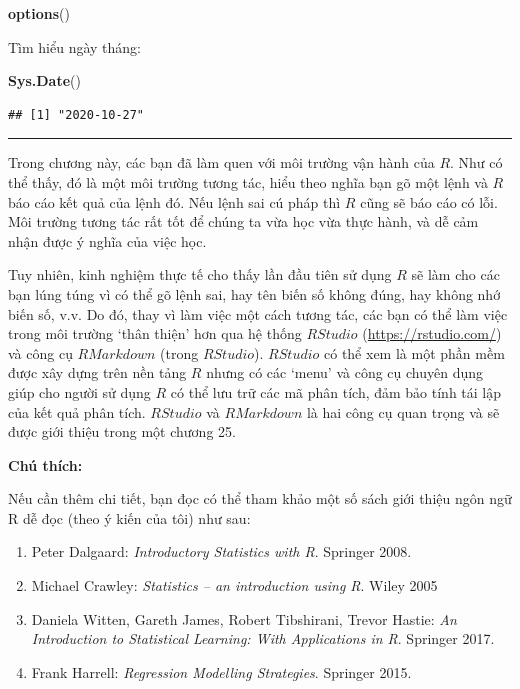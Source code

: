 \documentclass[
]{book}
\newenvironment{Shaded}{\begin{snugshade}}{\end{snugshade}}
\newcommand{\KeywordTok}[1]{\textcolor[rgb]{0.13,0.29,0.53}{\textbf{#1}}}
\newcommand{\NormalTok}[1]{#1}
\providecommand{\tightlist}{%
  \setlength{\itemsep}{0pt}\setlength{\parskip}{0pt}}
\begin{document}
\begin{Shaded}
\begin{Highlighting}[]
\KeywordTok{options}\NormalTok{()}
\end{Highlighting}
\end{Shaded}

Tìm hiểu ngày tháng:

\begin{Shaded}
\begin{Highlighting}[]
\KeywordTok{Sys.Date}\NormalTok{()}
\end{Highlighting}
\end{Shaded}

\begin{verbatim}
## [1] "2020-10-27"
\end{verbatim}

\begin{center}\rule{0.5\linewidth}{0.5pt}\end{center}

Trong chương này, các bạn đã làm quen với môi trường vận hành của \(R\). Như có thể thấy, đó là một môi trường tương tác, hiểu theo nghĩa bạn gõ một lệnh và \(R\) báo cáo kết quả của lệnh đó. Nếu lệnh sai cú pháp thì \(R\) cũng sẽ báo cáo có lỗi. Môi trường tương tác rất tốt để chúng ta vừa học vừa thực hành, và dễ cảm nhận được ý nghĩa của việc học.

Tuy nhiên, kinh nghiệm thực tế cho thấy lần đầu tiên sử dụng \(R\) sẽ làm cho các bạn lúng túng vì có thể gõ lệnh sai, hay tên biến số không đúng, hay không nhớ biến số, v.v. Do đó, thay vì làm việc một cách tương tác, các bạn có thể làm việc trong môi trường `thân thiện' hơn qua hệ thống \(RStudio\) (\url{https://rstudio.com/}) và công cụ \(RMarkdown\) (trong \(RStudio\)). \(RStudio\) có thể xem là một phần mềm được xây dựng trên nền tảng \(R\) nhưng có các `menu' và công cụ chuyên dụng giúp cho người sử dụng \(R\) có thể lưu trữ các mã phân tích, đảm bảo tính tái lập của kết quả phân tích. \(RStudio\) và \(RMarkdown\) là hai công cụ quan trọng và sẽ được giới thiệu trong một chương 25.

\textbf{Chú thích:}

Nếu cần thêm chi tiết, bạn đọc có thể tham khảo một số sách giới thiệu ngôn ngữ R dễ đọc (theo ý kiến của tôi) như sau:

\begin{enumerate}
\def\labelenumi{\arabic{enumi}.}
\tightlist
\item
  Peter Dalgaard: \emph{Introductory Statistics with R}. Springer 2008.
\item
  Michael Crawley: \emph{Statistics -- an introduction using R}. Wiley 2005
\item
  Daniela Witten, Gareth James, Robert Tibshirani, Trevor Hastie: \emph{An Introduction to Statistical Learning: With Applications in R}. Springer 2017.
\item
  Frank Harrell: \emph{Regression Modelling Strategies}. Springer 2015.
\end{enumerate}
\end{document}

